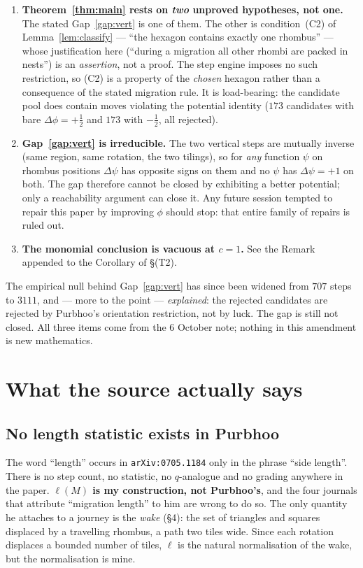 \documentclass[11pt]{article}
\theoremstyle{plain}
\theoremstyle{definition}
\begin{document}
\begin{enumerate}
\item[\textbf{[A1]}] \textbf{Theorem~\ref{thm:main} rests on \emph{two} unproved
  hypotheses, not one.}  The stated Gap~\ref{gap:vert} is one of them.  The other is
  condition~(C2) of Lemma~\ref{lem:classify} --- ``the hexagon contains exactly one
  rhombus'' --- whose justification here (``during a migration all other rhombi are
  packed in nests'') is an \emph{assertion}, not a proof.  The step engine imposes no
  such restriction, so (C2) is a property of the \emph{chosen} hexagon rather than a
  consequence of the stated migration rule.  It is load-bearing: the candidate pool
  does contain moves violating the potential identity ($173$ candidates with bare
  $\Delta\phi=+\tfrac12$ and $173$ with $-\tfrac12$, all rejected).
\item[\textbf{[A2]}] \textbf{Gap~\ref{gap:vert} is irreducible.}  The two vertical
  steps are mutually inverse (same region, same rotation, the two tilings), so for
  \emph{any} function $\psi$ on rhombus positions $\Delta\psi$ has opposite signs on
  them and no $\psi$ has $\Delta\psi=+1$ on both.  The gap therefore cannot be closed
  by exhibiting a better potential; only a reachability argument can close it.  Any
  future session tempted to repair this paper by improving $\phi$ should stop:
  that entire family of repairs is ruled out.
\item[\textbf{[A3]}] \textbf{The monomial conclusion is vacuous at $c=1$.}  See the
  Remark appended to the Corollary of \S(T2).
\end{enumerate}

The empirical null behind Gap~\ref{gap:vert} has since been widened from $707$ steps
to $3111$, and --- more to the point --- \emph{explained}: the rejected candidates are
rejected by Purbhoo's orientation restriction, not by luck.  The gap is still not
closed.  All three items come from the 6 October note; nothing in this amendment is
new mathematics.

\section{What the source actually says}

\subsection{No length statistic exists in Purbhoo}

The word ``length'' occurs in \texttt{arXiv:0705.1184} only in the phrase ``side
length''.  There is no step count, no statistic, no $q$-analogue and no grading
anywhere in the paper.  \textbf{$\ell(M)$ is my construction, not Purbhoo's}, and
the four journals that attribute ``migration length'' to him are wrong to do so.
The only quantity he attaches to a journey is the \emph{wake} (\S4): the set of
triangles and squares displaced by a travelling rhombus, a path two tiles wide.
Since each rotation displaces a bounded number of tiles, $\ell$ is the natural
normalisation of the wake, but the normalisation is mine.
\end{document}
